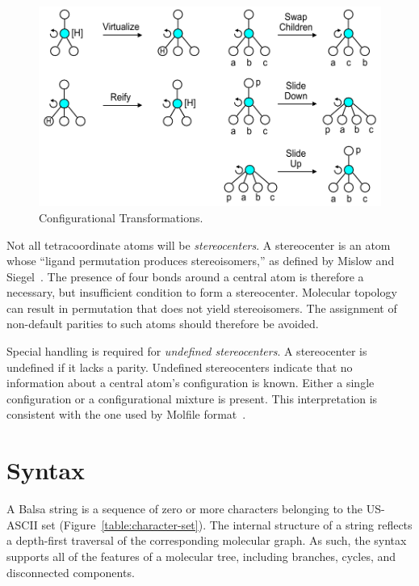 \documentclass{article}
\begin{document}
\begin{figure}
    \centering
    \includegraphics[width=\columnwidth]{configurational-transformations.pdf}
    \caption{Configurational Transformations.}
    \label{fig:configurational-transformations}
\end{figure}

Not all tetracoordinate atoms will be \textit{stereocenters}. A stereocenter is an atom whose \enquote{ligand permutation produces stereoisomers,} as defined by Mislow and Siegel~\cite{mislow:1984}. The presence of four bonds around a central atom is therefore a necessary, but insufficient condition to form a stereocenter. Molecular topology can result in permutation that does not yield stereoisomers. The assignment of non-default parities to such atoms should therefore be avoided.

Special handling is required for \textit{undefined stereocenters}. A stereocenter is undefined if it lacks a parity. Undefined stereocenters indicate that no information about a central atom's configuration is known. Either a single configuration or a configurational mixture is present. This interpretation is consistent with the one used by Molfile format~\cite{ctfileFormats}.

\section*{Syntax}

A Balsa string is a sequence of zero or more characters belonging to the US-ASCII set (Figure~\ref{table:character-set}). The internal structure of a string reflects a depth-first traversal of the corresponding molecular graph. As such, the syntax supports all of the features of a molecular tree, including branches, cycles, and disconnected components.
\end{document}
